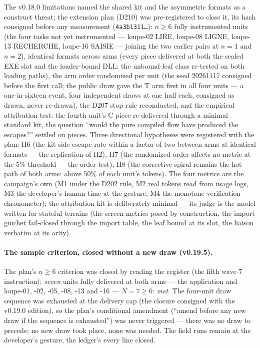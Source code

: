 \documentclass[10pt,a4paper]{article}
\newcommand{\code}[1]{\texttt{\small #1}}
\begin{document}
The v0.18.0 limitations named the shared kit and the asymmetric formats
as a construct threat; the extension plan (D210) was pre-registered to
close it, its hash consigned before any measurement
(\code{4a3b1311\ldots}): $n\ge6$ fully instrumented units (the four
tasks not yet instrumented --- loupe-02 LIRE, loupe-08 LIGNE, loupe-13
RECHERCHE, loupe-16 SAISIE --- joining the two earlier pairs at
$n{=}1$ and $n{=}2$), identical formats across arms (every piece
delivered at both the sealed EXE slot and the loader-bound DLL: the
unbound-leaf class re-tested on both loading paths), the arm order
randomized per unit (the seed 20261117 consigned before the first
call; the public draw gave the T arm first in all four units --- a
one-in-sixteen event, four independent draws at one half each,
consigned as drawn, never re-drawn), the D207 stop
rule reconducted, and the empirical attribution test: the fourth
unit's C piece re-delivered through a minimal standard kit, the
question ``would the pure compiled flow have produced the escapes?''
settled on pieces. Three directional hypotheses were registered
with the plan: H6 (the kit-side escape rate within a factor of two
between arms at identical formats --- the replication of H2), H7 (the
randomized order affects no metric at the 5\% threshold --- the order
test), H8 (the corrective spiral remains the hot path of both arms:
above 50\% of each unit's tokens). The four metrics are the
campaign's own (M1 under the D202 rule, M2 real tokens read from
usage logs, M3 the developer's human time at the gesture, M4 the
monotone verification chronometer); the attribution kit is deliberately
minimal --- its judge is the model written for stateful terrains (the
screen metrics posed by construction, the import guichet fail-closed
through the import table, the leaf bound at its slot, the liaison
verbatim at its arity).

\paragraph{The sample criterion, closed without a new draw (v0.19.5).}
The plan's $n\ge6$ criterion was closed by reading the register (the
fifth wave-7 instruction): \emph{seven} units fully delivered at both
arms --- the application and loupe-01, -02, -05, -08, -13 and -16 ---
$N{=}7\ge6$: \emph{met}. The four-unit draw sequence was exhausted
at the delivery cap (the closure consigned with the v0.19.0 edition),
so the plan's conditional amendment (``amend before any new draw if
the sequence is exhausted'') was never triggered --- there was no draw
to precede; no new draw took place, none was needed. The field runs
remain at the developer's gesture, the ledger's every line closed.
\end{document}
